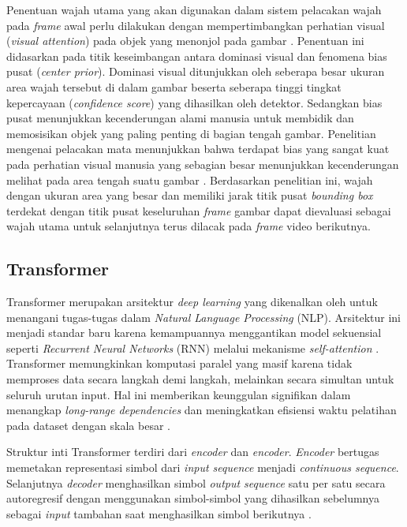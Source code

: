 Penentuan wajah utama yang akan digunakan dalam sistem pelacakan wajah pada \textit{frame} awal perlu dilakukan dengan mempertimbangkan perhatian visual (\textit{visual attention}) pada objek yang menonjol pada gambar \parencite{Liu2011}. Penentuan ini didasarkan pada titik keseimbangan antara dominasi visual dan fenomena bias pusat (\textit{center prior}). Dominasi visual ditunjukkan oleh seberapa besar ukuran area wajah tersebut di dalam gambar beserta seberapa tinggi tingkat kepercayaan (\textit{confidence score}) yang dihasilkan oleh detektor. Sedangkan bias pusat menunjukkan kecenderungan alami manusia untuk membidik dan memosisikan objek yang paling penting di bagian tengah gambar. Penelitian mengenai pelacakan mata menunjukkan bahwa terdapat bias yang sangat kuat pada perhatian visual manusia yang sebagian besar menunjukkan kecenderungan melihat pada area tengah suatu gambar \parencite{Judd2009}. Berdasarkan penelitian ini, wajah dengan ukuran area yang besar dan memiliki jarak titik pusat \textit{bounding box} terdekat dengan titik pusat keseluruhan \textit{frame} gambar dapat dievaluasi sebagai wajah utama untuk selanjutnya terus dilacak pada \textit{frame} video berikutnya.          

\subsection{Transformer}

Transformer merupakan arsitektur \textit{deep learning} yang dikenalkan oleh \textcite{Vaswani2023} untuk menangani tugas-tugas dalam \textit{Natural Language Processing} (NLP). Arsitektur ini menjadi standar baru karena kemampuannya menggantikan model sekuensial seperti \textit{Recurrent Neural Networks} (RNN) melalui mekanisme \textit{self-attention} \parencite{Vaswani2023}. Transformer memungkinkan komputasi paralel yang masif karena tidak memproses data secara langkah demi langkah, melainkan secara simultan untuk seluruh urutan input. Hal ini memberikan keunggulan signifikan dalam menangkap \textit{long-range dependencies} dan meningkatkan efisiensi waktu pelatihan pada dataset dengan skala besar \parencite{Liu2021}.

Struktur inti Transformer terdiri dari \textit{encoder} dan \textit{encoder}. \textit{Encoder} bertugas memetakan representasi simbol dari \textit{input sequence} menjadi \textit{continuous sequence}. Selanjutnya \textit{decoder} menghasilkan simbol \textit{output sequence} satu per satu secara autoregresif dengan menggunakan simbol-simbol yang dihasilkan sebelumnya sebagai \textit{input} tambahan saat menghasilkan simbol berikutnya \parencite{Vaswani2023}.

